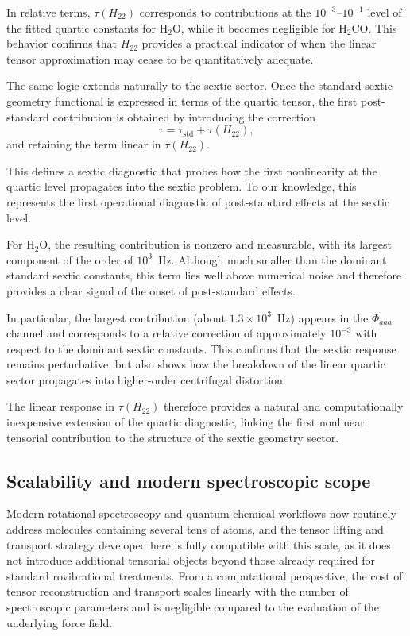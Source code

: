 \documentclass[aip,jcp,reprint,floatfix]{revtex4-2}
\begin{document}
In relative terms, $\tau(H_{22})$ corresponds to contributions at the
$10^{-3}$--$10^{-1}$ level of the fitted quartic constants for H$_2$O,
while it becomes negligible for H$_2$CO. This behavior confirms that
$H_{22}$ provides a practical indicator of when the linear tensor
approximation may cease to be quantitatively adequate.

The same logic extends naturally to the sextic sector. Once the
standard sextic geometry functional is expressed in terms of the
quartic tensor, the first post-standard contribution is obtained by
introducing the correction
\begin{equation}
\tau = \tau_{\mathrm{std}} + \tau(H_{22}),
\end{equation}
and retaining the term linear in $\tau(H_{22})$.

This defines a sextic diagnostic that probes how the first
nonlinearity at the quartic level propagates into the sextic problem.
To our knowledge, this represents the first operational diagnostic of
post-standard effects at the sextic level.

For H$_2$O, the resulting contribution is nonzero and measurable, with
its largest component of the order of $10^3$~Hz. Although much smaller
than the dominant standard sextic constants, this term lies well above
numerical noise and therefore provides a clear signal of the onset of
post-standard effects.

In particular, the largest contribution (about $1.3\times10^3$~Hz)
appears in the $\Phi_{aaa}$ channel and corresponds to a relative
correction of approximately $10^{-3}$ with respect to the dominant
sextic constants. This confirms that the sextic response remains
perturbative, but also shows how the breakdown of the linear quartic
sector propagates into higher-order centrifugal distortion.

The linear response in $\tau(H_{22})$ therefore provides a natural and
computationally inexpensive extension of the quartic diagnostic,
linking the first nonlinear tensorial contribution to the structure of
the sextic geometry sector.


\subsection{Scalability and modern spectroscopic scope}

Modern rotational spectroscopy and quantum-chemical workflows now
routinely address molecules containing several tens of atoms, and the
tensor lifting and transport strategy developed here is fully
compatible with this scale, as it does not introduce additional
tensorial objects beyond those already required for standard
rovibrational treatments. From a computational perspective, the cost 
of tensor reconstruction and transport scales linearly with the number 
of spectroscopic parameters and is negligible compared to the evaluation 
of the underlying force field.
\end{document}
